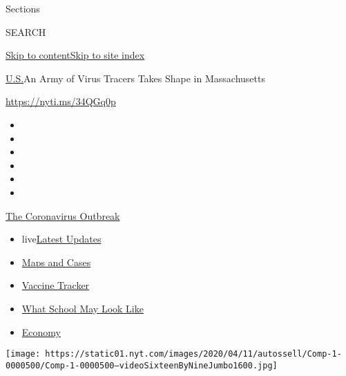 Sections

SEARCH

\protect\hyperlink{site-content}{Skip to
content}\protect\hyperlink{site-index}{Skip to site index}

\href{/section/us}{U.S.}\textbar{}An Army of Virus Tracers Takes Shape
in Massachusetts

\url{https://nyti.ms/34QGq0p}

\begin{itemize}
\item
\item
\item
\item
\item
\item
\end{itemize}

\href{https://www.nytimes.com/news-event/coronavirus?action=click\&pgtype=Article\&state=default\&region=TOP_BANNER\&context=storylines_menu}{The
Coronavirus Outbreak}

\begin{itemize}
\tightlist
\item
  live\href{https://www.nytimes.com/2020/08/01/world/coronavirus-covid-19.html?action=click\&pgtype=Article\&state=default\&region=TOP_BANNER\&context=storylines_menu}{Latest
  Updates}
\item
  \href{https://www.nytimes.com/interactive/2020/us/coronavirus-us-cases.html?action=click\&pgtype=Article\&state=default\&region=TOP_BANNER\&context=storylines_menu}{Maps
  and Cases}
\item
  \href{https://www.nytimes.com/interactive/2020/science/coronavirus-vaccine-tracker.html?action=click\&pgtype=Article\&state=default\&region=TOP_BANNER\&context=storylines_menu}{Vaccine
  Tracker}
\item
  \href{https://www.nytimes.com/interactive/2020/07/29/us/schools-reopening-coronavirus.html?action=click\&pgtype=Article\&state=default\&region=TOP_BANNER\&context=storylines_menu}{What
  School May Look Like}
\item
  \href{https://www.nytimes.com/live/2020/07/31/business/stock-market-today-coronavirus?action=click\&pgtype=Article\&state=default\&region=TOP_BANNER\&context=storylines_menu}{Economy}
\end{itemize}

\texttt{[image: https://static01.nyt.com/images/2020/04/11/autossell/Comp-1-0000500/Comp-1-0000500--videoSixteenByNineJumbo1600.jpg]}

